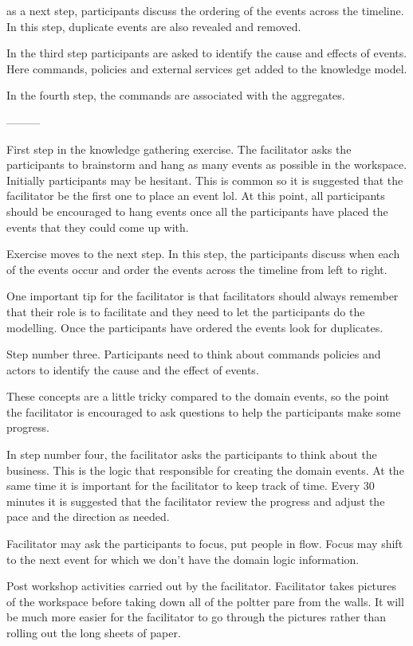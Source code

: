 \documentclass[a4paper, 11pt]{book}
\begin{document}
    as a next step, participants discuss the ordering of the events across the timeline.
    In this step, duplicate events are also revealed and removed.

    In the third step participants are asked to identify the cause and effects of events.
    Here commands, policies and external services get added to the knowledge model.

    In the fourth step, the commands are associated with the aggregates.

    ---------

    First step in the knowledge gathering exercise.
    The facilitator asks the participants to brainstorm and hang as many events as possible in the workspace.
    Initially participants may be hesitant.
    This is common so it is suggested that the facilitator be the first one to place an event lol.
    At this point, all participants should be encouraged to hang events once all the participants have placed the events that they could come up with.

    Exercise moves to the next step.
    In this step, the participants discuss when each of the events occur and order the events across the timeline from left to right.

    One important tip for the facilitator is that facilitators should always remember that their role is to facilitate and they need to let the participants do the modelling.
    Once the participants have ordered the events look for duplicates.

    Step number three.
    Participants need to think about commands policies and actors to identify the cause and the effect of events.

    These concepts are a little tricky compared to the domain events, so the point the facilitator is encouraged to ask questions to help the participants make some progress.

    In step number four, the facilitator asks the participants to think about the business.
    This is the logic that responsible for creating the domain events.
    At the same time it is important for the facilitator to keep track of time.
    Every 30 minutes it is suggested that the facilitator review the progress and adjust the pace and the direction as needed.

    Facilitator may ask the participants to focus, put people in flow.
    Focus may shift to the next event for which we don't have the domain logic information.

    Post workshop activities carried out by the facilitator.
    Facilitator takes pictures of the workspace before taking down all of the poltter pare from the walls.
    It will be much more easier for the facilitator to go through the pictures rather than rolling out the long sheets of paper.
\end{document}
